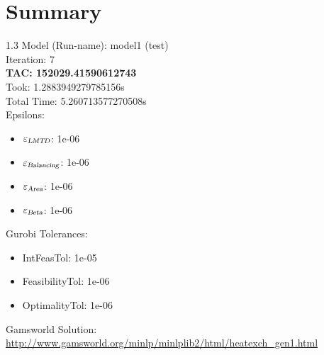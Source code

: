 \documentclass{article}%
\begin{document}
%
\normalsize%
\section{Summary}%
\thispagestyle{plain}%
\begin{spacing}{1.3}%
\Large%
Model (Run-name): model1 (test)\\%
Iteration: 7\\%
\textbf{TAC: 152029.41590612743}\\%
Took: 1.2883949279785156s\\%
Total Time: 5.260713577270508s\\%
Epsilons:%
\begin{itemize}%
	\item $\varepsilon_{\textsl{LMTD}}$: 1e-06%
	\item $\varepsilon_{\textsl{Balancing}}$: 1e-06%
	\item $\varepsilon_{\textsl{Area}}$: 1e-06%
	\item $\varepsilon_{\textsl{Beta}}$: 1e-06%
\end{itemize}%
Gurobi Tolerances:%
\begin{itemize}%
	\item IntFeasTol: 1e-05%
	\item FeasibilityTol: 1e-06%
	\item OptimalityTol: 1e-06%
\end{itemize}%
\end{spacing}%
\normalsize%
Gamsworld Solution: \url{http://www.gamsworld.org/minlp/minlplib2/html/heatexch_gen1.html}%
%
\clearpage%
\end{document}
